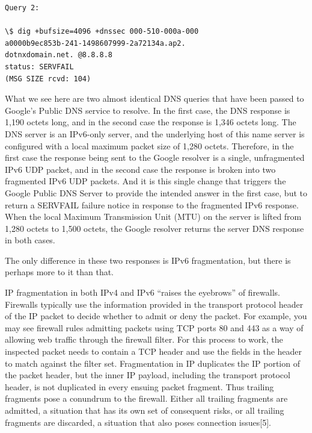 \begin{verbatim}
Query 2:

\$ dig +bufsize=4096 +dnssec 000-510-000a-000
a0000b9ec853b-241-1498607999-2a72134a.ap2.
dotnxdomain.net. @8.8.8.8
status: SERVFAIL
(MSG SIZE rcvd: 104)
\end{verbatim}

What we see here are two almost identical DNS queries that have
been passed to Google’s Public DNS service to resolve.
In the first case, the DNS response is 1,190 octets long, and in the
second case the response is 1,346 octets long. The DNS server is an
IPv6-only server, and the underlying host of this name server is configured
with a local maximum packet size of 1,280 octets. Therefore,
in the first case the response being sent to the Google resolver is a
single, unfragmented IPv6 UDP packet, and in the second case the
response is broken into two fragmented IPv6 UDP packets. And it is
this single change that triggers the Google Public DNS Server to provide
the intended answer in the first case, but to return a SERVFAIL
failure notice in response to the fragmented IPv6 response. When the
local Maximum Transmission Unit (MTU) on the server is lifted from
1,280 octets to 1,500 octets, the Google resolver returns the server
DNS response in both cases.

The only difference in these two responses is IPv6 fragmentation, but
there is perhaps more to it than that.

IP fragmentation in both IPv4 and IPv6 “raises the eyebrows” of
firewalls. Firewalls typically use the information provided in the
transport protocol header of the IP packet to decide whether to admit
or deny the packet. For example, you may see firewall rules admitting
packets using TCP ports 80 and 443 as a way of allowing web traffic
through the firewall filter. For this process to work, the inspected
packet needs to contain a TCP header and use the fields in the header
to match against the filter set. Fragmentation in IP duplicates the IP
portion of the packet header, but the inner IP payload, including the
transport protocol header, is not duplicated in every ensuing packet
fragment. Thus trailing fragments pose a conundrum to the firewall.
Either all trailing fragments are admitted, a situation that has its own
set of consequent risks, or all trailing fragments are discarded, a situation
that also poses connection issues[5].


